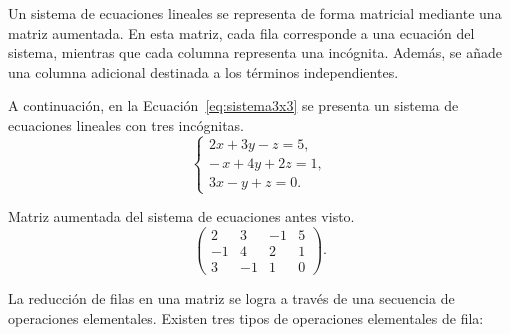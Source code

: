 \documentclass[12pt,a4paper]{article}
\begin{document}
Un sistema de ecuaciones lineales se representa de forma matricial mediante una matriz aumentada. En esta matriz, cada fila corresponde a una ecuación del sistema, mientras que cada columna representa una incógnita. Además, se añade una columna adicional destinada a los términos independientes.

A continuación, en la Ecuación~\ref{eq:sistema3x3} se presenta un sistema de ecuaciones lineales con tres incógnitas.
\begin{equation}
\begin{cases}
2x + 3y - z = 5, \\
-\,x + 4y + 2z = 1, \\
3x - y + z = 0.
\end{cases}
\label{eq:sistema3x3}
\end{equation}

Matriz aumentada del sistema de ecuaciones antes visto.
\[
\left(
\begin{array}{ccc|c}
2 & 3 & -1 & 5 \\
-1 & 4 & 2 & 1 \\
3 & -1 & 1 & 0
\end{array}
\right).
\]

La reducción de filas en una matriz se logra a través de una secuencia de operaciones elementales. Existen tres tipos de operaciones elementales de fila:
\end{document}
